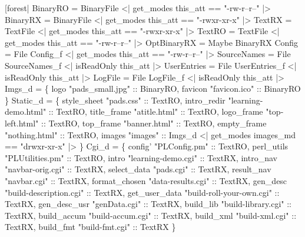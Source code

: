 \begin{code}
\mbox{}
[forest|
   BinaryRO    = BinaryFile     <| get_modes this_att ==  "-rw-r--r--" |>
   BinaryRX    = BinaryFile     <| get_modes this_att ==  "-rwxr-xr-x" |>
   TextRX      = TextFile       <| get_modes this_att ==  "-rwxr-xr-x" |>
   TextRO      = TextFile       <| get_modes this_att ==  "-rw-r--r--" |>
\mbox{}  
   OptBinaryRX = Maybe BinaryRX
\mbox{}
   Config      = File Config_f       <| get_modes this_att ==  "-rw-r--r--" |>
   SourceNames = File SourceNames_f  <| isReadOnly this_att |>
   UserEntries = File UserEntries_f  <| isReadOnly this_att |>
   LogFile     = File LogFile_f      <| isReadOnly this_att |>
\mbox{}
   Imgs_d =  \{
    logo      "pads_small.jpg" :: BinaryRO,
    favicon   "favicon.ico"    :: BinaryRO
  \}
\mbox{}
   Static_d =  \{
    style_sheet  "pads.css"           :: TextRO,   
    intro_redir  "learning-demo.html" :: TextRO,   
    title_frame  "atitle.html"        :: TextRO,   
    logo_frame   "top-left.html"      :: TextRO,   
    top_frame    "banner.html"        :: TextRO,   
    empty_frame  "nothing.html"       :: TextRO,
    images       "images"             :: Imgs_d  <| get_modes images_md == "drwxr-xr-x" |>
  \}
\mbox{}
   Cgi_d =  \{
    config'        "PLConfig.pm"             :: TextRO,   
    perl_utils     "PLUtilities.pm"          :: TextRO,     
    intro          "learning-demo.cgi"       :: TextRX,     
    intro_nav      "navbar-orig.cgi"         :: TextRX,     
    select_data    "pads.cgi"                :: TextRX,     
    result_nav     "navbar.cgi"              :: TextRX,     
    format_chosen  "data-results.cgi"        :: TextRX,     
    gen_desc       "build-description.cgi"   :: TextRX,     
    get_user_data  "build-roll-your-own.cgi" :: TextRX,     
    gen_desc_usr   "genData.cgi"             :: TextRX,     
    build_lib      "build-library.cgi"       :: TextRX,     
    build_accum    "build-accum.cgi"         :: TextRX,     
    build_xml      "build-xml.cgi"           :: TextRX,     
    build_fmt      "build-fmt.cgi"           :: TextRX     
  \}

\end{code}

